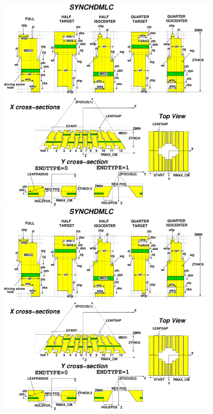 \documentclass[12pt,twoside]{article}
\begin{document}
\begin{figure}[htpb]
\begin{center}
\vspace*{-0.7cm}
\leavevmode
\begin{latexonly}
\hspace*{-2.5cm}
\includegraphics[width=21cm]{figures/synchdmlcd}
\end{latexonly}
\begin{htmlonly}
\includegraphics[width=13cm]{figures/synchdmlcd}

\end{htmlonly}
\end{center}
\end{figure}
\end{document}
